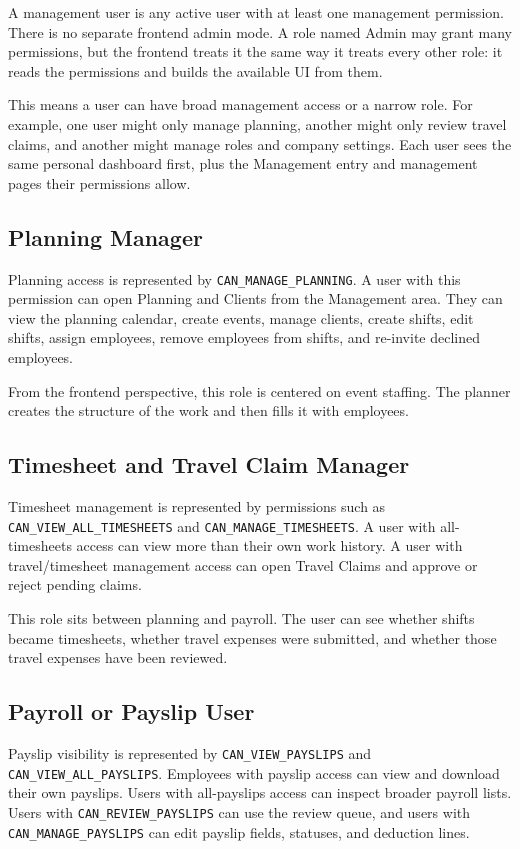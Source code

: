 \documentclass[11pt]{article}
\newcommand{\code}[1]{\nolinkurl{#1}}
\begin{document}
A management user is any active user with at least one management permission. There is no separate frontend admin mode. A role named Admin may grant many permissions, but the frontend treats it the same way it treats every other role: it reads the permissions and builds the available UI from them.

This means a user can have broad management access or a narrow role. For example, one user might only manage planning, another might only review travel claims, and another might manage roles and company settings. Each user sees the same personal dashboard first, plus the Management entry and management pages their permissions allow.

\subsection{Planning Manager}

Planning access is represented by \code{CAN_MANAGE_PLANNING}. A user with this permission can open Planning and Clients from the Management area. They can view the planning calendar, create events, manage clients, create shifts, edit shifts, assign employees, remove employees from shifts, and re-invite declined employees.

From the frontend perspective, this role is centered on event staffing. The planner creates the structure of the work and then fills it with employees.

\subsection{Timesheet and Travel Claim Manager}

Timesheet management is represented by permissions such as \code{CAN_VIEW_ALL_TIMESHEETS} and \code{CAN_MANAGE_TIMESHEETS}. A user with all-timesheets access can view more than their own work history. A user with travel/timesheet management access can open Travel Claims and approve or reject pending claims.

This role sits between planning and payroll. The user can see whether shifts became timesheets, whether travel expenses were submitted, and whether those travel expenses have been reviewed.

\subsection{Payroll or Payslip User}

Payslip visibility is represented by \code{CAN_VIEW_PAYSLIPS} and \code{CAN_VIEW_ALL_PAYSLIPS}. Employees with payslip access can view and download their own payslips. Users with all-payslips access can inspect broader payroll lists. Users with \code{CAN_REVIEW_PAYSLIPS} can use the review queue, and users with \code{CAN_MANAGE_PAYSLIPS} can edit payslip fields, statuses, and deduction lines.
\end{document}
